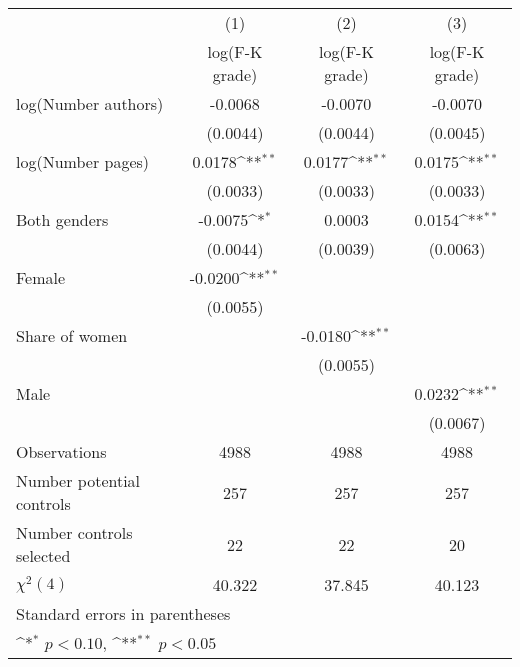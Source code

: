 {
\def\sym#1{\ifmmode^{#1}\else\(^{#1}\)\fi}
\begin{tabular}{l*{3}{c}}
\hline\hline
                    &\multicolumn{1}{c}{(1)}&\multicolumn{1}{c}{(2)}&\multicolumn{1}{c}{(3)}\\
                    &\multicolumn{1}{c}{log(F-K grade)}&\multicolumn{1}{c}{log(F-K grade)}&\multicolumn{1}{c}{log(F-K grade)}\\
\hline
\hspace{3mm}log(Number authors)&     -0.0068        &     -0.0070        &     -0.0070        \\
                    &    (0.0044)        &    (0.0044)        &    (0.0045)        \\
[1em]
\hspace{3mm}log(Number pages)&      0.0178\sym{**}&      0.0177\sym{**}&      0.0175\sym{**}\\
                    &    (0.0033)        &    (0.0033)        &    (0.0033)        \\
[1em]
\hspace{3mm}Both genders&     -0.0075\sym{*} &      0.0003        &      0.0154\sym{**}\\
                    &    (0.0044)        &    (0.0039)        &    (0.0063)        \\
[1em]
\hspace{3mm}Female  &     -0.0200\sym{**}&                    &                    \\
                    &    (0.0055)        &                    &                    \\
[1em]
\hspace{3mm}Share of women&                    &     -0.0180\sym{**}&                    \\
                    &                    &    (0.0055)        &                    \\
[1em]
\hspace{3mm}Male    &                    &                    &      0.0232\sym{**}\\
                    &                    &                    &    (0.0067)        \\
\hline
Observations        &        4988        &        4988        &        4988        \\
Number potential controls&         257        &         257        &         257        \\
Number controls selected&          22        &          22        &          20        \\
$\chi^2(4)$         &      40.322        &      37.845        &      40.123        \\
\hline\hline
\multicolumn{4}{l}{\footnotesize Standard errors in parentheses}\\
\multicolumn{4}{l}{\footnotesize \sym{*} \(p<0.10\), \sym{**} \(p<0.05\)}\\
\end{tabular}
}
